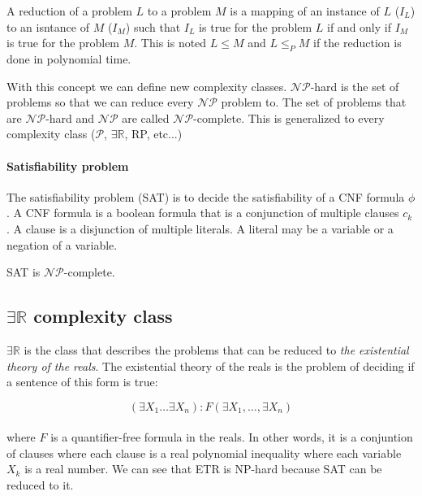 \begin{defn}
  A reduction of a problem $L$ to a problem $M$ is a mapping of an instance of $L$ ($I_L$)
  to an isntance of $M$ ($I_M$) such that $I_L$ is true for the problem $L$ if and
  only if $I_M$ is true for the problem $M$. This is noted $L \leq M$ and $L \leq_P M$
  if the reduction is done in polynomial time.
\end{defn}

With this concept we can define new complexity classes. $\mathcal{NP}$-hard is
the set of problems so that we can reduce every $\mathcal{NP}$ problem to. The set
of problems that are $\mathcal{NP}$-hard and $\mathcal{NP}$ are called $\mathcal{NP}$-complete.
This is generalized to every complexity class ($\mathcal{P}$, $\exists \mathbb{R}$, RP, etc...)

\paragraph{Satisfiability problem} The satisfiability problem (SAT) is to decide the satisfiability
of a CNF formula $\phi$. A CNF formula is a boolean formula that is a conjunction of multiple
clauses $c_k$. A clause is a disjunction of multiple literals. A literal may be a variable
or a negation of a variable.

\begin{theorem}
  SAT is $\mathcal{NP}$-complete.
\end{theorem}

\subsection{$\exists \mathbb{R}$ complexity class}

$\exists \mathbb{R}$ is the class that describes the problems that can be reduced to
\textit{the existential theory of the reals}\cite{ExistentialTheoryReals2006}. The
existential theory of the reals is the problem of deciding if a sentence of this form
is true:

$$(\exists X_1 \dots \exists X_n): F(\exists X_1, \dots,\exists X_n)$$\\

where $F$ is a quantifier-free formula in the reals. In other words, it is a
conjuntion of clauses where each clause is a real polynomial inequality where
each variable $X_k$ is a real number. We can see that ETR is NP-hard because
SAT can be reduced to it.


